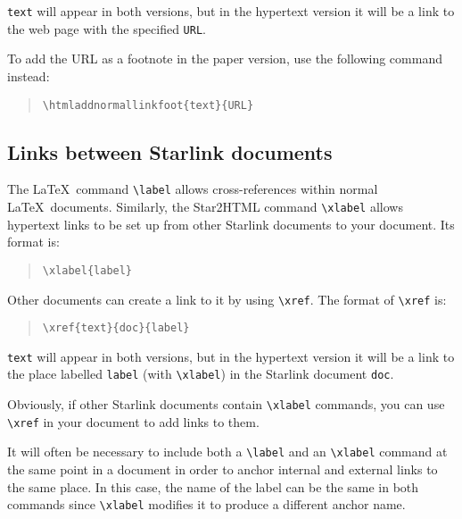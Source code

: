 \documentclass[twoside,11pt]{article}
\newcommand{\htmladdnormallinkfoot}[2]{#1\footnote{#2}}
\newcommand{\htmladdnormallink}[2]{#1}
\newcommand{\xref}[3]{#1}
\newcommand{\xlabel}[1]{}
\renewcommand{\_}{\texttt{\symbol{95}}}
\begin{document}
\texttt{text} will appear in both versions, but in the hypertext version it
will be a link to the web page with the specified
\htmladdnormallink{\texttt{URL}}
{http://www.w3.org/hypertext/WWW/Addressing/Addressing.html}.

To add the URL as a footnote in the paper version, use the following command
instead:

\begin{quote}
\begin{verbatim}
\htmladdnormallinkfoot{text}{URL}
\end{verbatim}
\end{quote}

\subsection{\xlabel{links_between_starlink_documents}Links between Starlink documents}

The \LaTeX\ command \verb#\label# allows cross-references within normal
\LaTeX\ documents.
Similarly, the Star2HTML command \verb#\xlabel# allows hypertext links to be
set up from other Starlink documents to your document.
Its format is:

\begin{quote}
\begin{verbatim}
\xlabel{label}
\end{verbatim}
\end{quote}

Other documents can create a link to it by using \verb+\xref+.
The format of \verb+\xref+ is:

\begin{quote}
\begin{verbatim}
\xref{text}{doc}{label}
\end{verbatim}
\end{quote}

\texttt{text} will appear in both versions, but in the hypertext version it
will be a link to the place labelled \texttt{label} (with \verb+\xlabel+) in
the Starlink document \texttt{doc}.

Obviously, if other Starlink documents contain \verb+\xlabel+ commands, you
can use \verb+\xref+ in your document to add links to them.

It will often be necessary to include both a \verb#\label# and an
\verb#\xlabel# command at the same point in a document in order to anchor
internal and external links to the same place.
In this case, the name of the label can be the same in both commands since
\verb#\xlabel# modifies it to produce a different anchor name.
\end{document}
